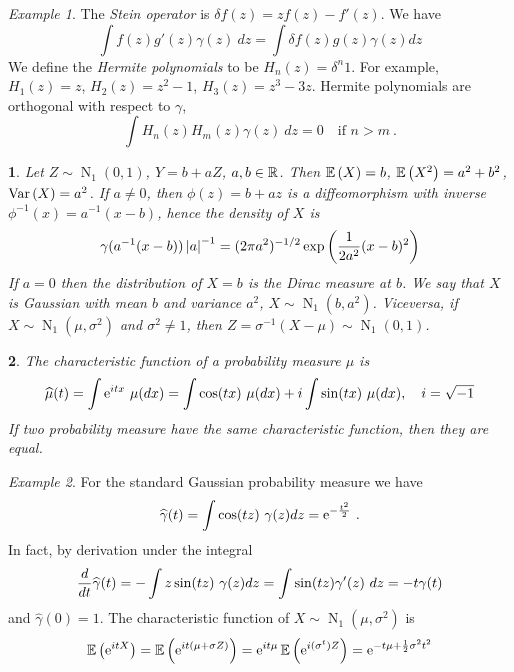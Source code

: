 \documentclass[12pt,a4paper]{amsart}
\newcommand{\gaussian}[3]{\operatorname{N}_{#1}\left(#2,#3\right)}
\theoremstyle{plain}%
\newtheorem{npar}{}%
\theoremstyle{definition}
\theoremstyle{remark}
\newtheorem{example}{Example}
\begin{document}
\begin{example}
  The \emph{Stein operator} is $\delta f(z) = zf(z) - f'(z)$. We have
\begin{equation*}
  \int f(z) g'(z) \gamma(z) \ dz =  \int \delta f(z) g(z) \gamma(z) dz
\end{equation*}
We define the \emph{Hermite polynomials} to be $H_n(z) = \delta^n 1$. For example, $H_1(z) = z$, $H_2(z) = z^2 -1$, $H_3(z) = z^3 - 3z$. Hermite polynomials are orthogonal with respect to $\gamma$,
\begin{equation*}
  \int H_n(z) H_m(z) \gamma(z) \ dz = 0 \quad \text{if $n > m$} \ .
\end{equation*}
\end{example}

\begin{npar} \normalfont
Let $Z \sim \gaussian 1 0 1$, $Y = b + a Z$, $a,b \in \mathbb{R}$. Then $\operatorname{\mathbb E}\left(X\right) = b$, $\operatorname{\mathbb E}\left(X^2\right) = a^2 + b^2$, $\operatorname{Var}\left(X\right) = a^2$. If $a \ne 0$, then $\phi(z) = b +a z$ is a diffeomorphism with inverse $\phi^{-1} (x) = a^{-1}(x-b)$, hence the density of $X$ is 
\begin{equation*}
  \gamma(a^{-1}(x-b))\left\vert a\right\vert^{-1} = (2\pi a^2)^{-1/2}\exp\left(\frac1{2a^2}(x-b)^2\right)
\end{equation*}
If $a=0$ then the distribution of $X=b$ is the Dirac measure at $b$. We say that $X$ is Gaussian with mean $b$ and variance $a^2$, $X \sim \gaussian 1 b {a^2}$. Viceversa, if $X \sim \gaussian 1 \mu {\sigma^2}$ and $\sigma^2 \ne 1$, then $Z = \sigma^{-1}(X - \mu) \sim \gaussian 1 0 1$.
\end{npar}

\begin{npar} \normalfont
The \emph{characteristic function} of a probability measure $\mu$ is
\begin{equation*}
  \widehat \mu(t) = \int \euler^{itx} \ \mu(dx) = \int \cos(tx) \ \mu(dx) + i \int \sin(tx) \ \mu(dx), \quad i = \sqrt{-1}
\end{equation*}
If two probability measure have the same characteristic function, then they are equal.
\end{npar}

\begin{example}
For the standard Gaussian probability measure we have
\begin{equation*}
  \widehat \gamma(t) = \int \cos(tz) \ \gamma(z) dz = \euler^{-\frac{t^2}2} \ .
\end{equation*}
In fact, by derivation under the integral
\begin{equation*}
  \frac{d}{dt} \widehat \gamma(t) =  -\int z \sin(tz) \ \gamma(z) dz = \int \sin(tz) \gamma'(z) \ dz = - t \gamma(t)
\end{equation*}
and $\widehat \gamma(0) = 1$.
The characteristic function of $X \sim \gaussian 1 \mu {\sigma^2}$ is
\begin{equation*}
  \operatorname{\mathbb E}\left(\mathrm{e}^{itX}\right) = \operatorname{\mathbb E}\left(\mathrm{e}^{it(\mu + \sigma Z)}\right) = \mathrm{e}^{it\mu} \operatorname{\mathbb E}\left(\mathrm{e}^{i(\sigma^t)Z}\right) = \mathrm{e}^{-t\mu+\frac12\sigma^2t^2}
\end{equation*}
\end{example}
\end{document}
